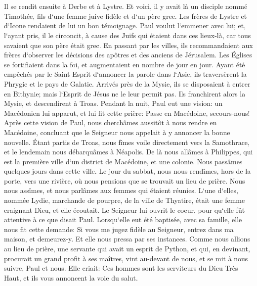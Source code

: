 \chapter{}

\verse Il se rendit ensuite à Derbe et à Lystre. Et voici, il y avait là un disciple nommé Timothée, fils d`une femme juive fidèle et d`un père grec. 
\verse Les frères de Lystre et d`Icone rendaient de lui un bon témoignage. 
\verse Paul voulut l`emmener avec lui; et, l`ayant pris, il le circoncit, à cause des Juifs qui étaient dans ces lieux-là, car tous savaient que son père était grec. 
\verse En passant par les villes, ils recommandaient aux frères d`observer les décisions des apôtres et des anciens de Jérusalem. 
\verse Les Églises se fortifiaient dans la foi, et augmentaient en nombre de jour en jour. 
\verse Ayant été empêchés par le Saint Esprit d`annoncer la parole dans l`Asie, ils traversèrent la Phrygie et le pays de Galatie. 
\verse Arrivés près de la Mysie, ils se disposaient à entrer en Bithynie; mais l`Esprit de Jésus ne le leur permit pas. 
\verse Ils franchirent alors la Mysie, et descendirent à Troas. 
\verse Pendant la nuit, Paul eut une vision: un Macédonien lui apparut, et lui fit cette prière: Passe en Macédoine, secours-nous! 
\verse Après cette vision de Paul, nous cherchâmes aussitôt à nous rendre en Macédoine, concluant que le Seigneur nous appelait à y annoncer la bonne nouvelle. 
\verse Étant partis de Troas, nous fîmes voile directement vers la Samothrace, et le lendemain nous débarquâmes à Néapolis. 
\verse De là nous allâmes à Philippes, qui est la première ville d`un district de Macédoine, et une colonie. Nous passâmes quelques jours dans cette ville. 
\verse Le jour du sabbat, nous nous rendîmes, hors de la porte, vers une rivière, où nous pensions que se trouvait un lieu de prière. Nous nous assîmes, et nous parlâmes aux femmes qui étaient réunies. 
\verse L`une d`elles, nommée Lydie, marchande de pourpre, de la ville de Thyatire, était une femme craignant Dieu, et elle écoutait. Le Seigneur lui ouvrit le coeur, pour qu`elle fût attentive à ce que disait Paul. 
\verse Lorsqu`elle eut été baptisée, avec sa famille, elle nous fit cette demande: Si vous me jugez fidèle au Seigneur, entrez dans ma maison, et demeurez-y. Et elle nous pressa par ses instances. 
\verse Comme nous allions au lieu de prière, une servante qui avait un esprit de Python, et qui, en devinant, procurait un grand profit à ses maîtres, vint au-devant de nous, 
\verse et se mit à nous suivre, Paul et nous. Elle criait: Ces hommes sont les serviteurs du Dieu Très Haut, et ils vous annoncent la voie du salut. 
